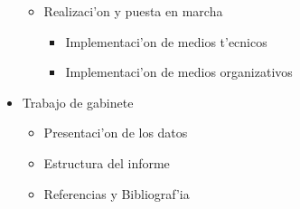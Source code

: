 \begin{itemize}
\begin{itemize}
\begin{itemize}
\end{itemize}
\item Realizaci'on y puesta en marcha
\begin{itemize}
\item Implementaci'on de medios t'ecnicos
\item Implementaci'on de medios organizativos
\end{itemize}
\end{itemize}
\item Trabajo de gabinete
\begin{itemize}
\item Presentaci'on de los datos
\item Estructura del informe
\item Referencias y Bibliograf'ia
\end{itemize}
\end{itemize}

\clearpage